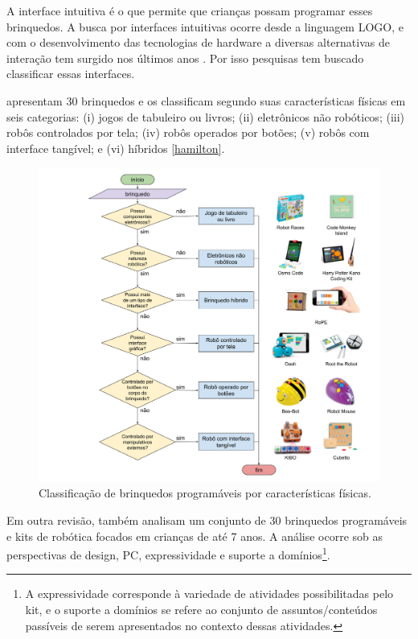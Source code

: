 A interface intuitiva é o que permite que crianças possam programar esses brinquedos. A busca por interfaces intuitivas ocorre desde a linguagem LOGO, e com o desenvolvimento das tecnologias de hardware a diversas alternativas de interação tem surgido nos últimos anos \cite{catlin_edurobots_2018}. Por isso pesquisas tem buscado classificar essas interfaces.

 apresentam 30 brinquedos e os classificam segundo suas características físicas em seis categorias: (i) jogos de tabuleiro ou livros; (ii) eletrônicos não robóticos; (iii) robôs controlados por tela; (iv) robôs operados por botões; (v) robôs com interface tangível; e (vi) híbridos \autoref{hamilton}. 

\begin{figure}[!htpb]
  \centering
  \includegraphics[width=.9\linewidth,fbox]{figs/hamilton_classification.png}
  \caption{Classificação de brinquedos programáveis por características físicas.}
  \label{hamilton}
\end{figure}

Em outra revisão,  também analisam um conjunto de 30 brinquedos programáveis e kits de robótica focados em crianças de até 7 anos. A análise ocorre sob as perspectivas de design, \acl{PC}, expressividade e suporte a domínios\footnote{
A expressividade corresponde à variedade de atividades possibilitadas pelo kit, e o suporte a domínios se refere ao conjunto de assuntos/conteúdos passíveis de serem apresentados no contexto dessas atividades.
}.


